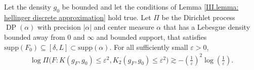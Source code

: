 \begin{proposition}\label{III.prop: bound of kullback neighborhood probability}
Let the density $g_0$ be bounded and let the conditions of Lemma \ref{III.lemma: hellinger discrete approximation} hold true. Let $\Pi$ be the Dirichlet process $\operatorname{DP}(\alpha)$ with precision $|\alpha|$ and center measure $\alpha$ that has a Lebesgue density bounded away from 0 and $\infty$ and bounded support, that satisfies $\mathrm{supp}(F_0) \subseteq [\delta,L] \subset \mathrm{supp}(\alpha)$. For all sufficiently small $\varepsilon>0$,
\begin{align}\label{III.eq: lower bound kullback balls}    
\log \Pi \bigg(F: K\left(g_{\scriptscriptstyle{F}}, g_0\right) \leq \varepsilon^2, K_2\left(g_{\scriptscriptstyle{F}}, g_0\right) \leq \varepsilon^2\bigg) \gtrsim - \left(\frac{1}{\varepsilon}\right)^{2}  \log \left(\frac{ 1}{\varepsilon}\right).
\end{align}
\end{proposition}
